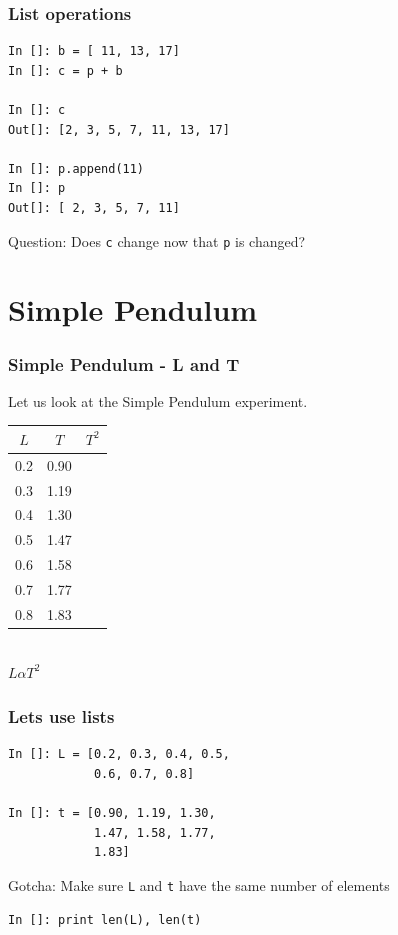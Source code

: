 \documentclass[14pt,compress]{beamer}
\newcounter{time}
\newcommand{\inctime}[1]{\addtocounter{time}{#1}{\tiny \thetime\ m}}
\newcommand{\typ}[1]{\lstinline{#1}}
\begin{document}
\begin{frame}[fragile]
\frametitle{List operations}
\begin{lstlisting}
In []: b = [ 11, 13, 17]
In []: c = p + b

In []: c
Out[]: [2, 3, 5, 7, 11, 13, 17]

In []: p.append(11)
In []: p
Out[]: [ 2, 3, 5, 7, 11]
\end{lstlisting}
Question: Does \typ{c} change now that \typ{p} is changed?
\inctime{10}
\end{frame}

\section{Simple Pendulum}
\begin{frame}[fragile]
\frametitle{Simple Pendulum - L and T}
Let us look at the Simple Pendulum experiment.
\begin{center}
\begin{small}
\begin{tabular}{| c | c | c |}
\hline
$L$ & $T$ & $T^2$ \\ \hline
0.2 & 0.90 & \\ \hline
0.3 & 1.19 & \\ \hline
0.4 & 1.30 & \\ \hline
0.5 & 1.47 & \\ \hline
0.6 & 1.58 & \\ \hline
0.7 & 1.77 & \\ \hline
0.8 & 1.83 & \\ \hline
\end{tabular}
\end{small}\\
\alert{$L \alpha T^2$}
\end{center}
\end{frame}

\begin{frame}[fragile]
\frametitle{Lets use lists}
\begin{lstlisting}
In []: L = [0.2, 0.3, 0.4, 0.5,
            0.6, 0.7, 0.8]

In []: t = [0.90, 1.19, 1.30,
            1.47, 1.58, 1.77,
            1.83]
\end{lstlisting}
\alert{Gotcha}: Make sure \typ{L} and \typ{t} have the same number
of elements

\begin{lstlisting}
In []: print len(L), len(t)
\end{lstlisting}

\end{frame}
\end{document}
